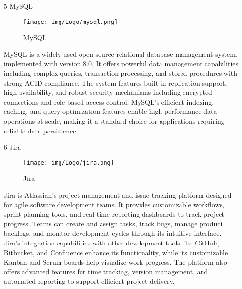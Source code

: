 \documentclass[conference]{IEEEtran}
\begin{document}
\begin{enumerate}
    \item[5] MySQL\par
    \vspace{0.3em}
    \begin{figure}[h]
    \centering
    \texttt{[image: img/Logo/mysql.png]}
    \centering
    \caption{MySQL} 
    \end{figure}\par
    \vspace{0.3em}
    MySQL is a widely-used open-source relational database management system, implemented with version 8.0. It offers powerful data management capabilities including complex queries, transaction processing, and stored procedures with strong ACID compliance. The system features built-in replication support, high availability, and robust security mechanisms including encrypted connections and role-based access control. MySQL's efficient indexing, caching, and query optimization features enable high-performance data operations at scale, making it a standard choice for applications requiring reliable data persistence.

    \vspace{1em}
    \newpage

    \item[6] Jira\par
    \vspace{3em}
    \begin{figure}[h]
    \centering
    \texttt{[image: img/Logo/jira.png]}
    \centering
    \caption{Jira} 
    \end{figure}\par
    \vspace{3em}
    Jira is Atlassian's project management and issue tracking platform designed for agile software development teams. It provides customizable workflows, sprint planning tools, and real-time reporting dashboards to track project progress. Teams can create and assign tasks, track bugs, manage product backlogs, and monitor development cycles through its intuitive interface. Jira's integration capabilities with other development tools like GitHub, Bitbucket, and Confluence enhance its functionality, while its customizable Kanban and Scrum boards help visualize work progress. The platform also offers advanced features for time tracking, version management, and automated reporting to support efficient project delivery.

    \vspace{1em}


\end{enumerate}
\end{document}
